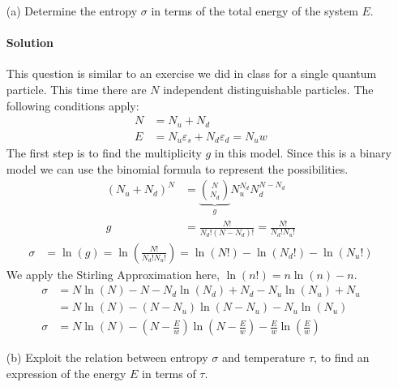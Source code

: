 \documentclass{article}
\begin{document}
	\begin{enumerate}
		\item[(a)] Determine the entropy $\sigma$ in terms of the total energy of the system $E$.
		\paragraph{Solution} This question is similar to an exercise we did in class for a single quantum particle. This time there are $N$ independent distinguishable particles. The following conditions apply:
		\begin{align*}
			N &= N_u + N_d \\
			E &= N_u \varepsilon_s + N_d \varepsilon_d = N_u w
		\end{align*}
		The first step is to find the multiplicity $g$ in this model. Since this is a binary model we can use the binomial formula to represent the possibilities. 
		\begin{align*}
			(N_u + N_d)^N &= \underbrace{\binom{N}{N_d}}_{g} N_u^{N_d} N_d^{N-N_d} \\
			g &= \frac{N!}{N_d! \left( N - N_d \right)!} = \frac{N!}{N_d! N_u!}
		\end{align*}
		\begin{align*}
			\sigma &= \ln(g) = \ln(\frac{N!}{N_d! N_u!}) = \ln(N!) - \ln(N_d!) - \ln(N_u!)
		\end{align*}
		We apply the Stirling Approximation here, $ \ln(n!) = n\ln(n) - n $.
		\begin{align*}
			\sigma &= N\ln(N) - N - N_d\ln(N_d) + N_d - N_u\ln(N_u) + N_u \\
			&= N\ln(N) - \left( N - N_u \right)\ln(N - N_u) - N_u\ln(N_u) \\
			\sigma &= N\ln(N) - \left( N - \frac{E}{w} \right)\ln(N - \frac{E}{w}) - \frac{E}{w}\ln(\frac{E}{w})
		\end{align*}
		\item[(b)] Exploit the relation between entropy $\sigma$ and temperature $\tau$, to find an expression of the energy $E$ in terms of $\tau$. 

\end{enumerate}
\end{document}
